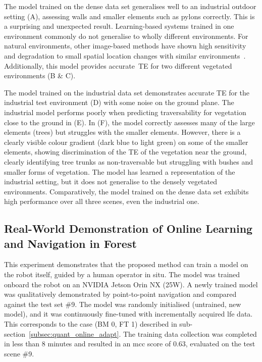 The model trained on the dense data set generalises well to an industrial outdoor setting (A), assessing walls and smaller elements such as pylons correctly. This is a surprising and unexpected result. Learning-based systems trained in one environment commonly do not generalise to wholly different environments. For natural environments, other image-based methods have shown high sensitivity and degradation to small spatial location changes with similar environments~\cite{frey2023fast}.  Additionally, this model provides accurate~\ac{TE} for two different vegetated environments (B \& C).

The model trained on the industrial data set demonstrates accurate \ac{TE} for the industrial test environment (D) with some noise on the ground plane. The industrial model performs poorly when predicting traversability for vegetation close to the ground in (E). In (F), the model correctly assesses many of the large elements (trees) but struggles with the smaller elements. However, there is a clearly visible colour gradient (dark blue to light green) on some of the smaller elements, showing discrimination of the \ac{TE} of the vegetation near the ground, clearly identifying tree trunks as non-traversable but struggling with bushes and smaller forms of vegetation. The model has learned a representation of the industrial setting, but it does not generalise to the densely vegetated environments. 
%
Comparatively, the model trained on the dense data set exhibits high performance over all three scenes, even the industrial one.

\subsection{Real-World Demonstration of Online Learning and Navigation in Forest}
\label{subsec:online_odap}

This experiment demonstrates that the proposed method can train a model on the robot itself, guided by a human operator in situ. The model was trained onboard the robot on an NVIDIA Jetson Orin NX (25W). A newly trained model was qualitatively demonstrated by point-to-point navigation and compared against the test set \#9.  The model was randomly initialised (untrained, new model), and it was continuously fine-tuned with incrementally acquired \ac{lfe} data. This corresponds to the case (BM 0, FT 1) described in sub-section~\ref{subsec:quant_online_adapt}. The training data collection was completed in less than 8 minutes and resulted in an \ac{mcc} score of 0.63, evaluated on the test scene \#9.

